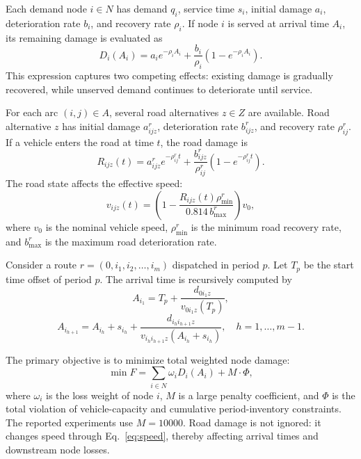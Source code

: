 ﻿\documentclass[preprint,12pt,authoryear]{elsarticle}
\begin{document}
Each demand node $i\in N$ has demand $q_i$, service time $s_i$, initial damage $a_i$, deterioration rate $b_i$, and recovery rate $\rho_i$. If node $i$ is served at arrival time $A_i$, its remaining damage is evaluated as
\begin{equation}
D_i(A_i)=a_i e^{-\rho_i A_i}+\frac{b_i}{\rho_i}\left(1-e^{-\rho_i A_i}\right).
\label{eq:node-damage}
\end{equation}
This expression captures two competing effects: existing damage is gradually recovered, while unserved demand continues to deteriorate until service.

For each arc $(i,j)\in A$, several road alternatives $z\in Z$ are available. Road alternative $z$ has initial damage $a_{ijz}^{r}$, deterioration rate $b_{ijz}^{r}$, and recovery rate $\rho_{ij}^{r}$. If a vehicle enters the road at time $t$, the road damage is
\begin{equation}
R_{ijz}(t)=a_{ijz}^{r}e^{-\rho_{ij}^{r}t}+\frac{b_{ijz}^{r}}{\rho_{ij}^{r}}\left(1-e^{-\rho_{ij}^{r}t}\right).
\label{eq:road-damage}
\end{equation}
The road state affects the effective speed:
\begin{equation}
v_{ijz}(t)=\left(1-\frac{R_{ijz}(t)\rho_{\min}^{r}}{0.814\,b_{\max}^{r}}\right)v_0,
\label{eq:speed}
\end{equation}
where $v_0$ is the nominal vehicle speed, $\rho_{\min}^{r}$ is the minimum road recovery rate, and $b_{\max}^{r}$ is the maximum road deterioration rate.

Consider a route $r=(0,i_1,i_2,\ldots,i_m)$ dispatched in period $p$. Let $T_p$ be the start time offset of period $p$. The arrival time is recursively computed by
\begin{equation}
A_{i_1}=T_p+\frac{d_{0i_1z}}{v_{0i_1z}(T_p)},
\end{equation}
\begin{equation}
A_{i_{h+1}}=A_{i_h}+s_{i_h}+\frac{d_{i_hi_{h+1}z}}{v_{i_hi_{h+1}z}(A_{i_h}+s_{i_h})},\quad h=1,\ldots,m-1.
\end{equation}

The primary objective is to minimize total weighted node damage:
\begin{equation}
\min F=\sum_{i\in N}\omega_i D_i(A_i)+M\cdot \Phi,
\label{eq:objective}
\end{equation}
where $\omega_i$ is the loss weight of node $i$, $M$ is a large penalty coefficient, and $\Phi$ is the total violation of vehicle-capacity and cumulative period-inventory constraints. The reported experiments use $M=10000$. Road damage is not ignored: it changes speed through Eq.~\eqref{eq:speed}, thereby affecting arrival times and downstream node losses.
\end{document}
